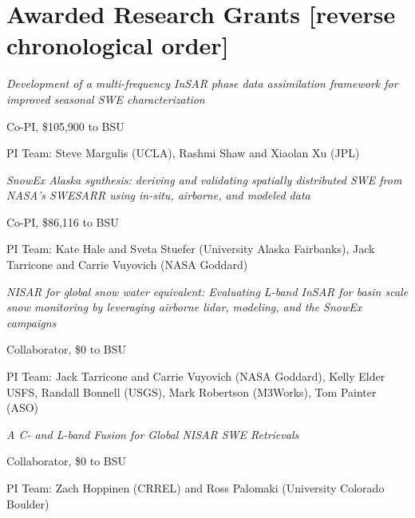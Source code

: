 \documentclass[11pt]{article}
\renewenvironment{itemize}{
  \begin{list}{}{
    \setlength{\leftmargin}{1.5em}
    \setlength{\itemsep}{0pt}
    \setlength{\parskip}{0pt}
  }
}{
  \end{list}
}
\begin{document}
\section*{Awarded Research Grants \small{[reverse chronological order]}}
\begin{itemize} 

\item[6/2025-5/2028] 
\begin{itemize}
\item \textit{Development of a multi-frequency InSAR phase data assimilation framework for improved seasonal SWE characterization}
\item Co-PI, \$105,900 to BSU
\item PI Team:  Steve Margulis (UCLA), Rashmi Shaw and Xiaolan Xu (JPL)
\end{itemize}

\item[6/2025-5/2028] 
\begin{itemize}
\item \textit{SnowEx Alaska synthesis: deriving and validating spatially distributed SWE from NASA's SWESARR using in-situ, airborne, and modeled data}
\item Co-PI, \$86,116 to BSU
\item PI Team: Kate Hale and Sveta Stuefer (University Alaska Fairbanks), Jack Tarricone and Carrie Vuyovich (NASA Goddard)
\end{itemize}

\item[6/2025-5/2028] 
\begin{itemize}
\item \textit{NISAR for global snow water equivalent: Evaluating L-band InSAR for basin scale snow monitoring by leveraging airborne lidar, modeling, and the SnowEx campaigns}
\item Collaborator, \$0 to BSU
\item PI Team: Jack Tarricone and Carrie Vuyovich (NASA Goddard), Kelly Elder USFS, Randall Bonnell (USGS), Mark Robertson (M3Works), Tom Painter (ASO)
\end{itemize}

\item[6/2025-5/2028] 
\begin{itemize}
\item \textit{A C- and L-band Fusion for Global NISAR SWE Retrievals}
\item Collaborator, \$0 to BSU
\item PI Team: Zach Hoppinen (CRREL) and Ross Palomaki (University Colorado Boulder)
\end{itemize}


\end{itemize}
\end{document}
